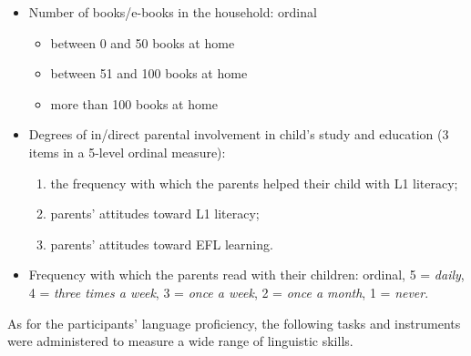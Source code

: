 \documentclass[output=paper,modfonts,nonflat,newtxmath]{langsci/langscibook}
\begin{document}
\begin{itemize}
\item Number of books/e-books in the household: ordinal
  \begin{itemize}
  \item between 0 and 50 books at home
  \item between 51 and 100 books at home
  \item more than 100 books at home
  \end{itemize}
\item Degrees of in/direct parental involvement in child’s study and education (3 items in a 5-level ordinal measure):
  \begin{enumerate}
  \item the frequency with which the parents helped their child with L1 literacy;
  \item parents’ attitudes toward L1 literacy;
  \item parents’ attitudes toward EFL learning.
  \end{enumerate}
\item Frequency with which the parents read with their children: ordinal, 5 = \textit{daily}, 4 = \textit{three times a week}, 3 = \textit{once a week}, 2 = \textit{once a month}, 1 = \textit{never}.
\end{itemize}

As for the participants’ language proficiency, the following tasks and instruments were administered to measure a wide range of linguistic skills.
\end{document}

